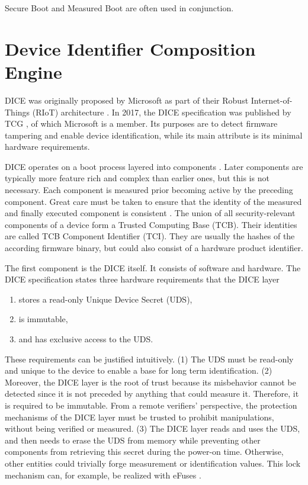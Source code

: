 Secure Boot and Measured Boot are often used in conjunction.

\section{Device Identifier Composition Engine}

\ac{DICE} was originally proposed by Microsoft as part of their Robust Internet-of-Things (RIoT) architecture \cite{England2016}. In 2017, the DICE specification was published by \ac{TCG} \cite{tcg-microsoft-tpm}, of which Microsoft is a member.
Its purposes are to detect firmware tampering and enable device identification, while its main attribute is its minimal hardware requirements.


DICE operates on a boot process layered into components \cite{dice-layering-arch}.
Later components are typically more feature rich and complex than earlier ones, but this is not necessary.
Each component is measured prior becoming active by the preceding component.
Great care must be taken to ensure that the identity of the measured and finally executed component is consistent \cite{Hristozov2022, Carpent2018}.
The union of all security-relevant components of a device form a Trusted Computing Base (TCB).
Their identities are called TCB Component Identifier (TCI).
They are usually the hashes of the according firmware binary, but could also consist of a hardware product identifier.


The first component is the DICE itself. It consists of software and hardware. The DICE specification \cite{dice-hardware-reqs} states three hardware requirements that the DICE layer 
\begin{enumerate}
  \item stores a read-only Unique Device Secret (UDS),
  \item is immutable,
  \item and has exclusive access to the UDS.
\end{enumerate}
These requirements can be justified intuitively.
(1) The UDS must be read-only and unique to the device to enable a base for long term identification.
(2) Moreover, the DICE layer is the root of trust because its misbehavior cannot be detected since it is not preceded by anything that could measure it.
Therefore, it is required to be immutable.
From a remote verifiers' perspective, the protection mechanisms of the DICE layer must be trusted to prohibit manipulations, without being verified or measured.
(3) The DICE layer reads and uses the UDS, and then needs to erase the UDS from memory while preventing other components from retrieving this secret during the power-on time.
Otherwise, other entities could trivially forge measurement or identification values. This lock mechanism can, for example, be realized with eFuses \cite{dice-hardware-reqs}.

